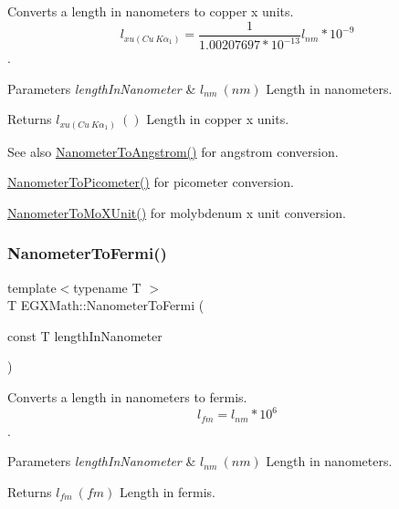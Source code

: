 Converts a length in nanometers to copper x units. \[ l_{xu(Cu\ K\alpha_1)}= \frac{1}{1.00207697*10^{-13}} l_{nm} * 10^{-9}\]. 


\begin{DoxyParams}{Parameters}
{\em length\+In\+Nanometer} & $ l_{nm}\ (nm)$ Length in nanometers. \\
\hline
\end{DoxyParams}
\begin{DoxyReturn}{Returns}
$ l_{xu(Cu\ K\alpha_1)}\ ()$ Length in copper x units. 
\end{DoxyReturn}
\begin{DoxySeeAlso}{See also}
\mbox{\hyperlink{group___e_g_x_math-_conversions-_length_conversions-_nanometer-_non-_s_i_ga7e2062d4cc1a422e54da597c4413efb1}{Nanometer\+To\+Angstrom()}} for angstrom conversion. 

\mbox{\hyperlink{group___e_g_x_math-_conversions-_length_conversions-_nanometer-_s_i_gaba1e9bf91f6e065f8ba8be8dd039b499}{Nanometer\+To\+Picometer()}} for picometer conversion. 

\mbox{\hyperlink{group___e_g_x_math-_conversions-_length_conversions-_nanometer-_non-_s_i_gacc6d7fa95c35687718c816df3c95c7b5}{Nanometer\+To\+Mo\+X\+Unit()}} for molybdenum x unit conversion. 
\end{DoxySeeAlso}
\mbox{\label{group___e_g_x_math-_conversions-_length_conversions-_nanometer-_non-_s_i_ga9b708f83b519464f5ebb912bcaaf747d}} 
\subsubsection{\texorpdfstring{Nanometer\+To\+Fermi()}{NanometerToFermi()}}
{\footnotesize\ttfamily template$<$typename T $>$ \\
T E\+G\+X\+Math\+::\+Nanometer\+To\+Fermi (\begin{DoxyParamCaption}\item[{const T}]{length\+In\+Nanometer }\end{DoxyParamCaption})}



Converts a length in nanometers to fermis. \[ l_{fm}=l_{nm} * 10^{6} \]. 


\begin{DoxyParams}{Parameters}
{\em length\+In\+Nanometer} & $ l_{nm}\ (nm)$ Length in nanometers. \\
\hline
\end{DoxyParams}
\begin{DoxyReturn}{Returns}
$ l_{fm}\ (fm)$ Length in fermis. 
\end{DoxyReturn}
\mbox{\label{group___e_g_x_math-_conversions-_length_conversions-_nanometer-_non-_s_i_ga278b008cafd5027568e16cbc8af7fb6a}} 
